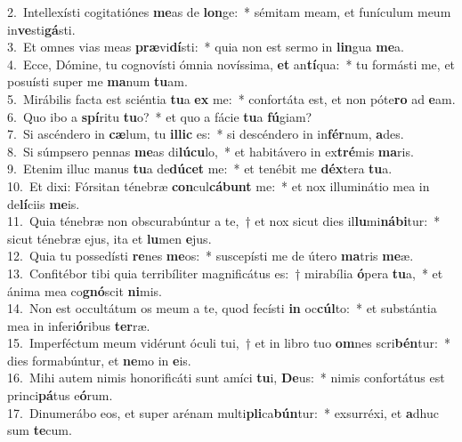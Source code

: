 {2.~}Intellexísti cogitatiónes \textbf{me}as de \textbf{lon}ge:~* sémitam meam, et funículum meum in\textbf{ve}sti\textbf{gá}sti.\\
{3.~}Et omnes vias meas \textbf{præ}vi\textbf{dí}sti:~* quia non est sermo in \textbf{lin}gua \textbf{me}a.\\
{4.~}Ecce, Dómine, tu cognovísti ómnia novíssima, \textbf{et} an\textbf{tí}qua:~* tu formásti me, et posuísti super me \textbf{ma}num \textbf{tu}am.\\
{5.~}Mirábilis facta est sciéntia \textbf{tu}a \textbf{ex} me:~* confortáta est, et non póte\textbf{ro} ad \textbf{e}am.\\
{6.~}Quo ibo a \textbf{spí}ritu \textbf{tu}o?~* et quo a fácie \textbf{tu}a \textbf{fú}giam?\\
{7.~}Si ascéndero in \textbf{cæ}lum, tu \textbf{il}\textbf{lic} es:~* si descéndero in in\textbf{fér}num, \textbf{a}des.\\
{8.~}Si súmpsero pennas \textbf{me}as di\textbf{lú}\textbf{cu}lo,~* et habitávero in ex\textbf{tré}mis \textbf{ma}ris.\\
{9.~}Etenim illuc manus \textbf{tu}a de\textbf{dú}\textbf{cet} me:~* et tenébit me \textbf{déx}tera \textbf{tu}a.\\
{10.~}Et dixi: Fórsitan ténebræ \textbf{con}cul\textbf{cá}\textbf{bunt} me:~* et nox illuminátio mea in de\textbf{lí}ciis \textbf{me}is.\\
{11.~}Quia ténebræ non obscurabúntur a te,~† et nox sicut dies il\textbf{lu}mi\textbf{ná}\textbf{bi}tur:~* sicut ténebræ ejus, ita et \textbf{lu}men \textbf{e}jus.\\
{12.~}Quia tu possedísti \textbf{re}nes \textbf{me}os:~* suscepísti me de útero \textbf{ma}tris \textbf{me}æ.\\
{13.~}Confitébor tibi quia terribíliter magnificátus es:~† mirabília \textbf{ó}pera \textbf{tu}a,~* et ánima mea co\textbf{gnó}scit \textbf{ni}mis.\\
{14.~}Non est occultátum os meum a te, quod fecísti \textbf{in} oc\textbf{cúl}to:~* et substántia mea in inferi\textbf{ó}ribus \textbf{ter}ræ.\\
{15.~}Imperféctum meum vidérunt óculi tui,~† et in libro tuo \textbf{om}nes scri\textbf{bén}tur:~* dies formabúntur, et \textbf{ne}mo in \textbf{e}is.\\
{16.~}Mihi autem nimis honorificáti sunt amíci \textbf{tu}i, \textbf{De}us:~* nimis confortátus est princi\textbf{pá}tus e\textbf{ó}rum.\\
{17.~}Dinumerábo eos, et super arénam multi\textbf{pli}ca\textbf{bún}tur:~* exsurréxi, et \textbf{a}dhuc sum \textbf{te}cum.\\
